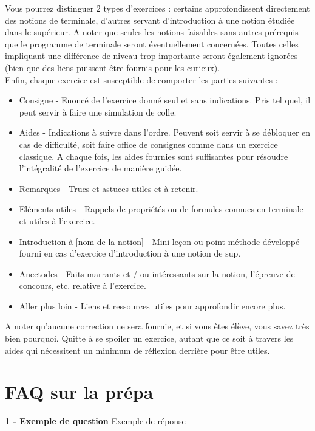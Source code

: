 \documentclass[a4paper]{report}
\begin{document}
		Vous pourrez distinguer 2 types d'exercices : certains approfondissent directement des notions de terminale, d'autres servant d'introduction à une notion étudiée dans le supérieur. A noter que seules les notions faisables sans autres prérequis que le programme de terminale seront éventuellement concernées. Toutes celles impliquant une différence de niveau trop importante seront également ignorées (bien que des liens puissent être fournis pour les curieux).\\
		Enfin, chaque exercice est susceptible de comporter les parties suivantes :
		\begin{itemize}
			\item Consigne - Enoncé de l'exercice donné seul et sans indications. Pris tel quel, il peut servir à faire une simulation de colle.
			\item Aides - Indications à suivre dans l'ordre. Peuvent soit servir à se débloquer en cas de difficulté, soit faire office de consignes comme dans un exercice classique. A chaque fois, les aides fournies sont suffisantes pour résoudre l'intégralité de l'exercice de manière guidée.
			\item Remarques - Trucs et astuces utiles et à retenir.
			\item Eléments utiles - Rappels de propriétés ou de formules connues en terminale et utiles à l'exercice.
			\item Introduction à [nom de la notion] - Mini leçon ou point méthode développé fourni en cas d'exercice d'introduction à une notion de sup.
			\item Anectodes - Faits marrants et / ou intéressants sur la notion, l'épreuve de concours, etc. relative à l'exercice.
			\item Aller plus loin - Liens et ressources utiles pour approfondir encore plus.
		\end{itemize}
		A noter qu'aucune correction ne sera fournie, et si vous êtes élève, vous savez très bien pourquoi. Quitte à se spoiler un exercice, autant que ce soit à travers les aides qui nécessitent un minimum de réflexion derrière pour être utiles.
		
	\chapter{FAQ sur la prépa}
	
		\pagebreak		
			
		\begin{tcolorbox}[colback=white,colframe=black]
			\textbf{1 - Exemple de question}
			\tcblower
			Exemple de réponse
		\end{tcolorbox}
		
\end{document}
